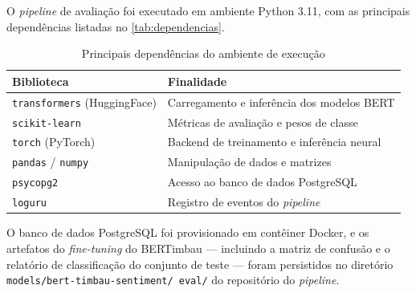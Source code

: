 O \textit{pipeline} de avaliação foi executado em ambiente Python 3.11, com as principais dependências listadas no \autoref{tab:dependencias}.

\begin{table}[!htbp]
	\caption[Principais dependências do ambiente de execução]{Principais dependências do ambiente de execução}
	\label{tab:dependencias}
	\centering
	\begin{tabular}{ll}
		\hline
		\textbf{Biblioteca} & \textbf{Finalidade} \\
		\hline
		\texttt{transformers} (HuggingFace) & Carregamento e inferência dos modelos BERT \\
		\hline
		\texttt{scikit-learn}               & Métricas de avaliação e pesos de classe \\
		\hline
		\texttt{torch} (PyTorch)            & Backend de treinamento e inferência neural \\
		\hline
		\texttt{pandas} / \texttt{numpy}    & Manipulação de dados e matrizes \\
		\hline
		\texttt{psycopg2}                   & Acesso ao banco de dados PostgreSQL \\
		\hline
		\texttt{loguru}                     & Registro de eventos do \textit{pipeline} \\
		\hline
	\end{tabular}
\end{table}

O banco de dados PostgreSQL foi provisionado em contêiner Docker, e os artefatos do \textit{fine-tuning} do BERTimbau --- incluindo a matriz de confusão e o relatório de classificação do conjunto de teste --- foram persistidos no diretório \texttt{models/bert-timbau-sentiment/ eval/} do repositório do \textit{pipeline}.